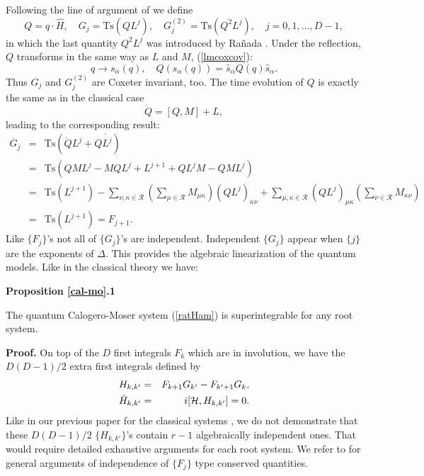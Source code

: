 \documentclass[a4paper,12pt]{article}
\begin{document}
Following the line of argument of \cite{cfs} we define
\begin{equation}
    Q=q\cdot\hat{H},\quad G_{j}=\mbox{Ts}(QL^j),
    \quad G_{j}^{(2)}=\mbox{Ts}(Q^{2}L^j),\quad j=0,1,\ldots, D-1,
    \label{Qdef}
\end{equation}
in which the last quantity $Q^{2}L^j$ was introduced by Ra\~nada
\cite{Ranada}.
Under the reflection, $Q$ transforms in the same way as $L$ and $M$,
(\ref{lmcoxcov}):
\begin{equation}
  q\to s_{\alpha}(q), \quad
Q(s_{\alpha}(q))= \hat{s}_\alpha Q(q)\hat{s}_\alpha.
\label{qcoxcov}
\end{equation}
Thus $G_j$ and $G_{j}^{(2)}$ are Coxeter invariant, too.
The time evolution of $Q$ is exactly the same as in the classical
case \cite{cfs}
\begin{equation}\label{RQ}
  \dot{Q}=[Q,M]+L,
\end{equation}
leading to the corresponding result:
\begin{eqnarray}
    \dot{G_j} &=& \mbox{Ts}(\dot{Q}L^j+Q\dot{L^j})\nonumber\\
  &=& \mbox{Ts}(QML^j-MQL^j+L^{j+1}+QL^jM-QML^j)\nonumber\\
  &=& \mbox{Ts}(L^{j+1})-\sum_{\nu,\kappa\in{\mathcal
  R}}(\sum_{\mu\in{\mathcal R}}M_{\mu\kappa})(QL^j)_{\kappa\nu}+
  \sum_{\mu,\kappa\in{\mathcal
  R}}(QL^j)_{\mu\kappa}(\sum_{\nu\in{\mathcal
  R}}M_{\kappa\nu})\nonumber\\
  &=& \mbox{Ts}(L^{j+1})=F_{j+1}.
    \label{Fgrel}
\end{eqnarray}
Like $\{F_{j}\}$'s not all of $\{G_{j}\}$'s are independent.
Independent $\{G_{j}\}$ appear when $\{j\}$
are the exponents of $\Delta$.
This provides the algebraic linearization of the quantum models.
Like in the classical theory we have:

\bigskip
{\bf Proposition \ref{cal-mo}.1}


The quantum Calogero-Moser system (\ref{ratHam}) is superintegrable for
any root system.

{\bf Proof.}
        On top of  the $D$ first integrals $F_{k}$ which are in involution,
we have
the $D(D-1)/2$ extra first integrals defined by
\begin{eqnarray}
H_{k,k'}&=&F_{k+1}G_{k'}-F_{k'+1}G_{k},\label{defHjk}\\
\dot{H}_{k,k'}&=&i[{\cal H}, H_{k,k'}]=0.
\label{Hjkcons}
\end{eqnarray}
Like in our previous paper for the classical systems \cite{cfs},
we do not demonstrate
that these $D(D-1)/2$ $\{H_{k,k'}\}$'s contain $r-1$
algebraically independent ones. That would require detailed exhaustive
arguments for each root system.
We refer to \cite{kps} for general arguments of independence of $\{F_j\}$
type conserved quantities.
\end{document}
